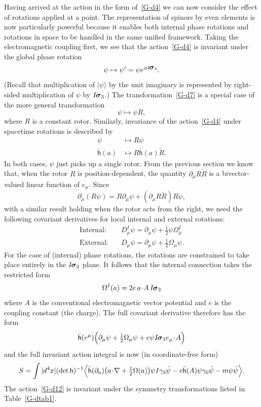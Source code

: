 \documentclass[a4paper]{article}
\numberwithin{equation}{section}
\newcommand{\dt}{\! \cdot \!}
\newcommand{\la}{\langle}
\newcommand{\ra}{\rangle}
\newcommand{\half}{{\textstyle \frac{1}{2}}}
\newcommand{\eqv}{=}
\newcommand{\sig}{\mbox{\boldmath $\sigma$}}
\newcommand{\Om}{\Omega}
\newcommand{\bsig}{\mbox{\boldmath $\sig$}}
\newcommand{\da}{\partial_a}
\newcommand{\dmu}{\partial_{\mu}}
\newcommand{\isk}{I \hspace{-1pt} \bsig_3}
\newcommand{\gk}{\gamma_{3}}
\newcommand{\go}{\gamma_{0}}
\newcommand{\Rrev}{\tilde{R}}
\newcommand{\psirev}{\tilde{\psi}}
\newcommand{\lih}{\mathsf{h}}
\newcommand{\lbh}{\bar{\mathsf{h}}}
\newcommand{\ho}{\lbh}
\newcommand{\hu}{\lih}
\newcommand{\grad}{\nabla}
\begin{document}
Having arrived at the action in the form of~\eqref{G-d4} we can now
consider the effect of rotations applied at a point.  The
representation of spinors by even elements is now particularly
powerful because it enables both internal phase rotations and
rotations in space to be handled in the same unified framework.
Taking the electromagnetic coupling first, we see that the
action~\eqref{G-d4} is invariant under the global phase rotation
%
\begin{equation}
\psi \mapsto \psi' \eqv \psi e^{\phi \isk}.
\label{G-d7}
\end{equation}
%
(Recall that multiplication of $|\psi\ra$ by the unit imaginary is
represented by right-sided multiplication of $\psi$ by $\isk$.)  The
transformation~\eqref{G-d7} is a special case of the more general
transformation
%
\begin{equation}
\psi \mapsto \psi R,
\label{G-d9I}
\end{equation}
%
where $R$ is a constant rotor.  Similarly, invariance of the
action~\eqref{G-d4} under spacetime rotations is described by
%
\begin{align}
\psi &\mapsto R \psi \\
\ho(a) &\mapsto R \ho(a) \Rrev.
\label{G-d9II}
\end{align}
%
In both cases, $\psi$ just picks up a single rotor.  From the previous
section we know that, when the rotor $R$ is position-dependent, the
quantity $\dmu R\Rrev$ is a bivector-valued linear function of
$e_\mu$.  Since
%
\begin{equation}
\dmu (R \psi) = R \dmu \psi + (\dmu R \Rrev) R\psi,
\end{equation}
%
with a similar result holding when the rotor acts from the right, we
need the following covariant derivatives for local internal and
external rotations:
%
\begin{align}
\mbox{Internal:} \quad & D_\mu^I \psi = \dmu \psi + \half \psi
\Om^I_\mu \\
\mbox{External:} \quad & D_\mu \psi = \dmu \psi + \half \Om_\mu
\psi. 
\end{align}
%
For the case of (internal) phase rotations, the rotations are
constrained to take place entirely in the $\isk$ plane.  It follows
that the internal connection takes the restricted form
%
\begin{equation} 
\Om^I(a) = 2e\, a\dt A \, \isk
\end{equation}
%
where $A$ is the conventional electromagnetic vector
potential and $e$ is the coupling constant (the charge). The
full covariant derivative therefore has the form
%
\begin{equation}
\ho(e^\mu) \Bigl( \dmu \psi + \half \Om_\mu \psi + e \psi \isk e_\mu
\dt A \Bigr) 
\end{equation}
%
and the full invariant action integral is now (in coordinate-free form)
%
\begin{equation}
S= \int |d^4 x|(\det\hu)^{-1} \Bigl\la \ho(\da) \bigl(a \dt \grad +
\half \Om(a) \bigr) \psi I\gk \psirev -e \ho(A) \psi \go \psirev  - m
\psi \psirev \Bigr\ra. 
\label{G-d12}
\end{equation}
%
The action~\eqref{G-d12} is invariant under the symmetry transformations
listed in Table~\ref{G-dtab1}.  
\end{document}
